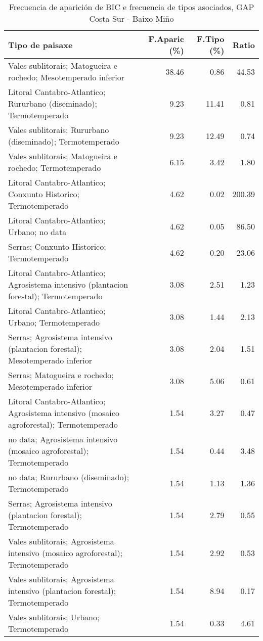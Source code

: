 \begin{table}[p]
\centering
\caption{Frecuencia de aparición de BIC e frecuencia de tipos asociados, GAP Costa Sur - Baixo Miño} 
\label{vbic3}
\begin{tabular}{lrrr}
  \hline
Tipo de paisaxe & F.Aparic (\%) & F.Tipo (\%) & Ratio \\ 
  \hline
Vales sublitorais; Matogueira e rochedo; Mesotemperado inferior & 38.46 & 0.86 & 44.53 \\ 
  Litoral Cantabro-Atlantico; Rururbano (diseminado); Termotemperado & 9.23 & 11.41 & 0.81 \\ 
  Vales sublitorais; Rururbano (diseminado); Termotemperado & 9.23 & 12.49 & 0.74 \\ 
  Vales sublitorais; Matogueira e rochedo; Termotemperado & 6.15 & 3.42 & 1.80 \\ 
  Litoral Cantabro-Atlantico; Conxunto Historico; Termotemperado & 4.62 & 0.02 & 200.39 \\ 
  Litoral Cantabro-Atlantico; Urbano; no data & 4.62 & 0.05 & 86.50 \\ 
  Serras; Conxunto Historico; Termotemperado & 4.62 & 0.20 & 23.06 \\ 
  Litoral Cantabro-Atlantico; Agrosistema intensivo (plantacion forestal); Termotemperado & 3.08 & 2.51 & 1.23 \\ 
  Litoral Cantabro-Atlantico; Urbano; Termotemperado & 3.08 & 1.44 & 2.13 \\ 
  Serras; Agrosistema intensivo (plantacion forestal); Mesotemperado inferior & 3.08 & 2.04 & 1.51 \\ 
  Serras; Matogueira e rochedo; Mesotemperado inferior & 3.08 & 5.06 & 0.61 \\ 
  Litoral Cantabro-Atlantico; Agrosistema intensivo (mosaico agroforestal); Termotemperado & 1.54 & 3.27 & 0.47 \\ 
  no data; Agrosistema intensivo (mosaico agroforestal); Termotemperado & 1.54 & 0.44 & 3.48 \\ 
  no data; Rururbano (diseminado); Termotemperado & 1.54 & 1.13 & 1.36 \\ 
  Serras; Agrosistema intensivo (plantacion forestal); Termotemperado & 1.54 & 2.79 & 0.55 \\ 
  Vales sublitorais; Agrosistema intensivo (mosaico agroforestal); Termotemperado & 1.54 & 2.92 & 0.53 \\ 
  Vales sublitorais; Agrosistema intensivo (plantacion forestal); Termotemperado & 1.54 & 8.94 & 0.17 \\ 
  Vales sublitorais; Urbano; Termotemperado & 1.54 & 0.33 & 4.61 \\ 
   \hline
\end{tabular}
\end{table}
